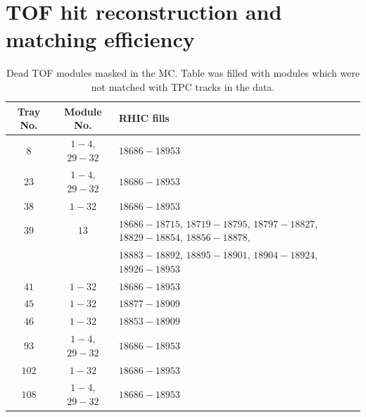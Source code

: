 
\chapter{TOF hit reconstruction and matching efficiency}\label{appendix:tofEff}


\begin{table}[h]%
	\centering%
	\begin{tabular}{c|c|l}%
		\textbf{Tray No.}&	\textbf{Module No.} & 	\textbf{RHIC fills}\\ \hline
		$8$	& $1-4$, $29-32$ & $18686-18953$\\ \hline
		$23$	& $1-4$, $29-32$ & $18686-18953$\\ \hline
		$38$	& $1-32$ & $18686-18953$\\ \hline
		$39$	& $13$ & $18686-18715$, $18719-18795$, $18797-18827$, $18829-18854$, $18856-18878$,\\
		& &$18883-18892$, $18895-18901$, $18904-18924$, $18926-18953$\\ \hline
		$41$	& $1-32$ & $18686-18953$\\ \hline
		$45$	& $1-32$ & $18877-18909$\\ \hline
		$46$	& $1-32$ & $18853-18909$\\ \hline
		$93$	& $1-4$, $29-32$ & $18686-18953$\\ \hline
		$102$	& $1-32$ & $18686-18953$\\ \hline
		$108$	& $1-4$, $29-32$ & $18686-18953$\\ \hline
	\end{tabular}%
	\caption[Dead TOF modules masked in the MC.]{Dead TOF modules masked in the MC. Table was filled with modules which were not matched with TPC tracks in the data.}\label{tab:tofDeadModules}
\end{table}

